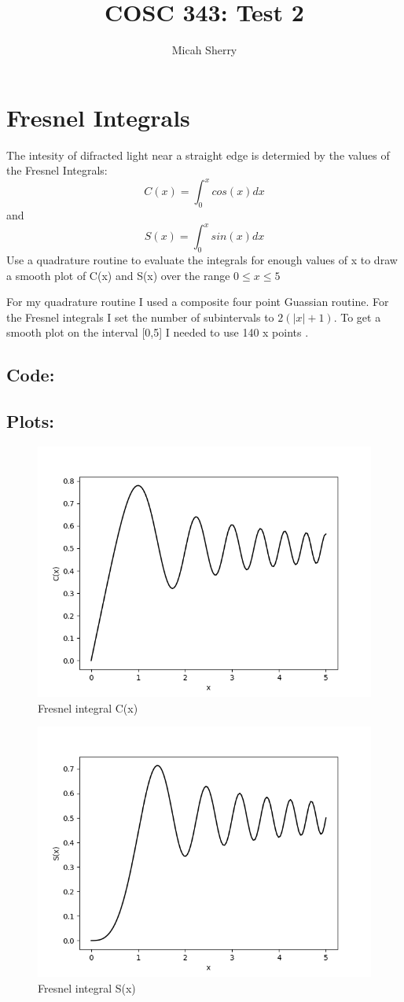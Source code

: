 \documentclass{article}
\title{COSC 343: Test 2}
\author{Micah Sherry}
\begin{document}
\maketitle
\section{Fresnel Integrals}
	The intesity of difracted light near a straight edge is determied by the values of the Fresnel Integrals: 
	$$C(x) = \int_{0}^x cos(x)dx $$ and $$S(x) = \int_{0}^x sin(x)dx $$
	Use a quadrature routine to evaluate the integrals for enough values of x to draw a smooth plot of C(x) and S(x) over the range
	$0 \le x \le 5$

	For my quadrature routine I used a composite four point Guassian routine. 
	For the Fresnel integrals I set the number of subintervals to $2(|x|+1)$.     
	To get a smooth plot on the interval [0,5] I needed to use 140 x points .
\subsection*{Code:}
	
\subsection*{Plots:}
	\begin{figure}[hbt!]
		\centering
		\includegraphics[width=.75\linewidth]{C(x)_plot.png}
		\caption{Fresnel integral C(x)}
		\label{fig: Fresnel integrals C(x)}
	\end{figure}
	
	\begin{figure}[hbt!]
		\centering
		\includegraphics[width=.75\linewidth]{S(x)_plot.png}
		\caption{Fresnel integral S(x)}
		\label{fig: Fresnel integrals S(x)}
	\end{figure}
\end{document}
